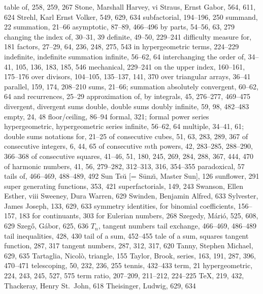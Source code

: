 \sub table of, 258, 259, 267
Stone, Marshall Harvey, vi
Straus, Ernst Gabor, 564, 611, 624
Strehl, Karl Ernst Volker, 549, 629, 634
subfactorial, 194--196, 250
summand, 22
summation, 21--66
\sub asymptotic, 87--89, 466--496
\sub by parts, 54--56, 63, 279
\sub changing the index of, 30--31, 39
\sub definite, 49--50, 229--241
\sub difficulty measure for, 181
\sub factors, 27--29, 64, 236, 248, 275, 543
\sub in hypergeometric terms, 224--229
\sub indefinite, \see indefinite summation
\sub infinite, 56--62, 64
\sub interchanging the order of, 34--41, 105, 136, 183, 185, 546
\sub mechanical, 229--241
\sub on the upper index, 160--161, 175--176
\sub over divisors, 104--105, 135--137, 141, 370
\sub over triangular arrays, 36--41
\sub parallel, 159, 174, 208--210
sums, 21--66; \also summation
\sub absolutely convergent, 60--62, 64
\sub and recurrences, 25--29
\sub approximation of, by integrals, 45, 276--277, 469--475
\sub divergent, \see divergent sums
\sub double, \see double sums
\sub doubly infinite, 59, 98, 482--483
\sub empty, 24, 48
\sub floor/ceiling, 86--94
\sub formal, 321; \also formal power series
\sub hypergeometric, \see hypergeometric series
\sub infinite, 56--62, 64
\sub multiple, 34--41, 61; \also double sums
\sub notations for, 21--25
\sub of consecutive cubes, 51, 63, 283, 289, 367
\sub of consecutive integers, 6, 44, 65
\sub of consecutive $m$th powers, 42, 283--285, 288--290, 366--368
\sub of consecutive squares, 41--46, 51, 180, 245, 269, 284, 288, 367, 444, 470
\sub of harmonic numbers, 41, 56, 279--282, 312--313, 316, 354--355
\sub paradoxical, 57
\sub tails of, 466--469, 488--489, 492
Sun Ts\u u [= S\=unz\u{\i}, Master Sun], 126
sunflower, 291
super generating functions, 353, 421
superfactorials, 149, 243
Swanson, Ellen Esther, viii
Sweeney, Dura Warren, 629
Swinden, Benjamin Alfred, 633
Sylvester, James Joseph, 133, 629, 633
symmetry identities,
\sub for binomial coefficients, 156--157, 183
\sub for continuants, 303
\sub for Eulerian numbers, 268
Szegedy, M\'ari\'o, 525, 608, 629
Szeg\H{o}, G\'abor, 625, 636
\medskip
$T_n$, \see tangent numbers
tail exchange, 466--469, 486--489
tail inequalities, 428, 430
tail of a sum, 452--455
tale of a sum, \see squares
tangent function, 287, 317
tangent numbers, 287, 312, 317, 620
Tanny, Stephen Michael, 629, 635
Tartaglia, Nicol\`o, triangle, 155
Taylor, Brook, series, 163, 191, 287, 396, 470--471
telescoping, 50, 232, 236, 255
tennis, 432--433
term, 21
\sub hypergeometric, 224, 243, 245, 527, 575
term ratio, 207--209, 211--212, 224--225
\TeX, 219, 432, \cpage
Thackeray, Henry St.~John, 618
Theisinger, Ludwig, 629, 634
